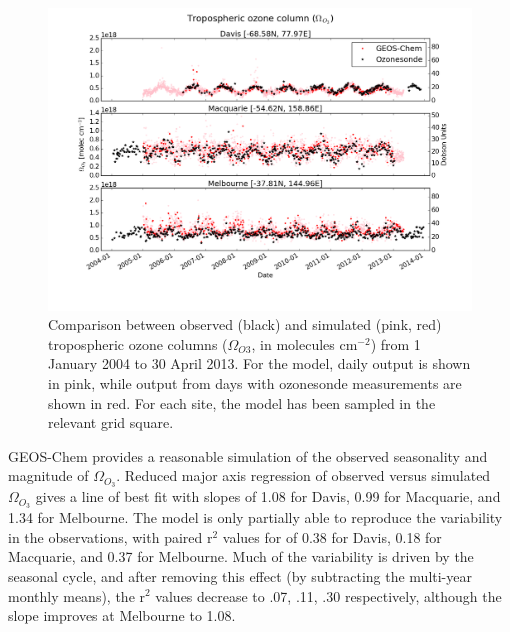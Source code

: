 \documentclass[acp, manuscript]{copernicus} %
\begin{document}
  \begin{figure}
    \includegraphics[width=12.0cm]{figures/StationSeries.png}
    \caption{Comparison between observed (black) and simulated (pink, red) tropospheric ozone columns ($\Omega_{O3}$, in molecules cm$^{-2}$) from 1 January 2004 to 30 April 2013.
    For the model, daily output is shown in pink, while output from days with ozonesonde measurements are shown in red.
    For each site, the model has been sampled in the relevant grid square.}
    \label{fig:StationSeriesGEOSChem}
  \end{figure}
  
  GEOS-Chem provides a reasonable simulation of the observed seasonality and magnitude of $\Omega_{O_3}$.
  Reduced major axis regression of observed versus simulated $\Omega_{O_3}$ gives a line of best fit with slopes of 1.08 for Davis, 0.99 for Macquarie, and 1.34 for Melbourne.
  The model is only partially able to reproduce the variability in the observations, with paired r$^2$ values for of 0.38 for Davis, 0.18 for Macquarie, and 0.37 for Melbourne.
  Much of the variability is driven by the seasonal cycle, and after removing this effect (by subtracting the multi-year monthly means), the r$^2$ values decrease to .07, .11, .30 respectively, although the slope improves at Melbourne to 1.08.
  
\end{document}

